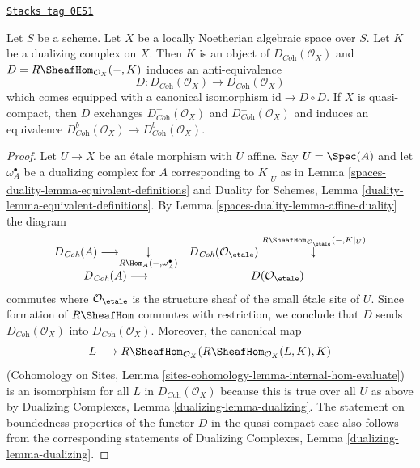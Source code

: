 \begin{lemma}
\label{spaces-duality-lemma-dualizing-spaces}
\href{https://stacks.math.columbia.edu/tag/0E51}{\texttt{Stacks tag 0E51}}

Let $S$ be a scheme. Let $X$ be a locally Noetherian algebraic space over $S$.
Let $K$ be a dualizing complex on $X$.
Then $K$ is an object of $D_{\textit{Coh}}(\mathcal{O}_X)$
and $D = R\SheafHom_{\mathcal{O}_X}(-, K)$ induces an anti-equivalence
$$
D :
D_{\textit{Coh}}(\mathcal{O}_X)
\longrightarrow
D_{\textit{Coh}}(\mathcal{O}_X)
$$
which comes equipped with a canonical isomorphism
$\text{id} \to D \circ D$. If $X$ is quasi-compact, then
$D$ exchanges $D^+_{\textit{Coh}}(\mathcal{O}_X)$ and
$D^-_{\textit{Coh}}(\mathcal{O}_X)$ and induces an equivalence
$D^b_{\textit{Coh}}(\mathcal{O}_X) \to D^b_{\textit{Coh}}(\mathcal{O}_X)$.
\end{lemma}

\begin{proof}
Let $U \to X$ be an \'etale morphism with $U$ affine. Say $U = \Spec(A)$ and
let $\omega_A^\bullet$ be a dualizing complex for $A$ corresponding to $K|_U$
as in Lemma \ref{spaces-duality-lemma-equivalent-definitions} and
Duality for Schemes, Lemma \ref{duality-lemma-equivalent-definitions}.
By Lemma \ref{spaces-duality-lemma-affine-duality} the diagram
$$
\begin{array}{cc}D_{\textit{Coh}}(A) \longrightarrow\underset{R\Hom_A(-, \omega_A^\bullet)}{\downarrow} & D_{\textit{Coh}}(\mathcal{O}_\etale)
\overset{R\SheafHom_{\mathcal{O}_\etale}(-, K|_U)}{\downarrow} \\ D_{\textit{Coh}}(A) \longrightarrow & D(\mathcal{O}_\etale)\end{array}
$$
commutes where $\mathcal{O}_\etale$ is the structure sheaf of the
small \'etale site of $U$. Since formation of $R\SheafHom$ commutes
with restriction, we conclude that $D$ sends
$D_{\textit{Coh}}(\mathcal{O}_X)$ into
$D_{\textit{Coh}}(\mathcal{O}_X)$. Moreover, the canonical map
$$
L \longrightarrow
R\SheafHom_{\mathcal{O}_X}(R\SheafHom_{\mathcal{O}_X}(L, K), K)
$$
(Cohomology on Sites, Lemma \ref{sites-cohomology-lemma-internal-hom-evaluate})
is an isomorphism for all $L$ in $D_{\textit{Coh}}(\mathcal{O}_X)$
because this is true over all $U$ as above by
Dualizing Complexes, Lemma \ref{dualizing-lemma-dualizing}.
The statement on boundedness properties of the functor $D$
in the quasi-compact case also follows from the corresponding
statements of Dualizing Complexes, Lemma \ref{dualizing-lemma-dualizing}.
\end{proof}

